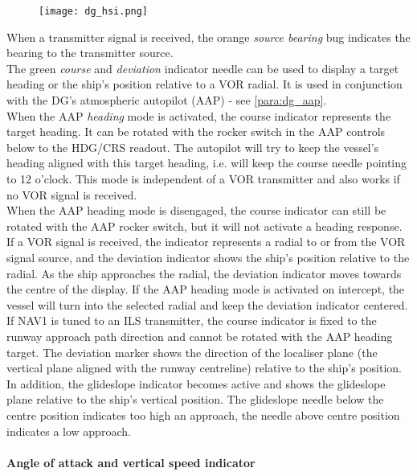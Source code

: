 \documentclass[Orbiter User Manual.tex]{subfiles}
\begin{document}
\begin{figure}[H]
  \centering
  \texttt{[image: dg\_hsi.png]}
\end{figure}

\noindent
When a transmitter signal is received, the orange \textit{source bearing} bug indicates the bearing to the transmitter source.\\
The green \textit{course} and \textit{deviation} indicator needle can be used to display a target heading or the ship's position relative to a VOR radial. It is used in conjunction with the DG's atmospheric autopilot (AAP) - see \ref{para:dg_aap}.\\
When the AAP \textit{heading} mode is activated, the course indicator represents the target heading. It can be rotated with the rocker switch in the AAP controls below to the HDG/CRS readout. The autopilot will try to keep the vessel's heading aligned with this target heading, i.e. will keep the course needle pointing to 12 o'clock. This mode is independent of a VOR transmitter and also works if no VOR signal is received.\\
When the AAP heading mode is disengaged, the course indicator can still be rotated with the AAP rocker switch, but it will not activate a heading response. If a VOR signal is received, the indicator represents a radial to or from the VOR signal source, and the deviation indicator shows the ship's position relative to the radial. As the ship approaches the radial, the deviation indicator moves towards the centre of the display. If the AAP heading mode is activated on intercept, the vessel will turn into the selected radial and keep the deviation indicator centered.\\
If NAV1 is tuned to an ILS transmitter, the course indicator is fixed to the runway approach path direction and cannot be rotated with the AAP heading target. The deviation marker shows the direction of the localiser plane (the vertical plane aligned with the runway centreline) relative to the ship's position. In addition, the glideslope indicator becomes active and shows the glideslope plane relative to the ship's vertical position. The glideslope needle below the centre position indicates too high an approach, the needle above centre position indicates a low approach.


\paragraph{Angle of attack and vertical speed indicator}
\end{document}
